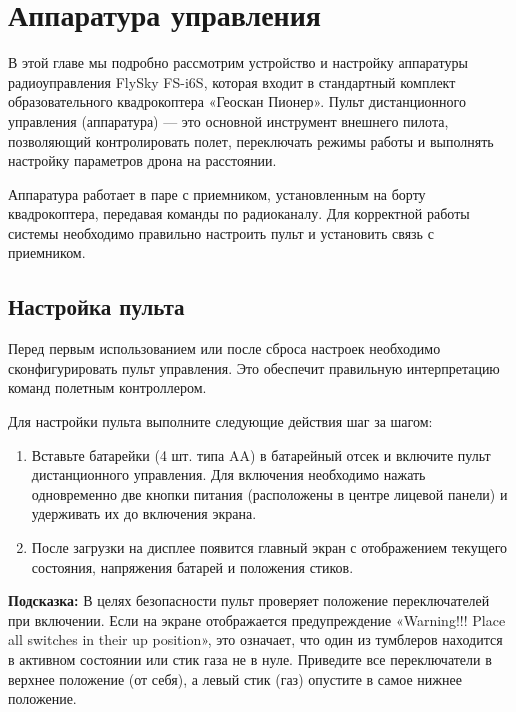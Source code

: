 \section{Аппаратура управления}
\label{sec:rc-control}

В этой главе мы подробно рассмотрим устройство и настройку аппаратуры радиоуправления FlySky FS-i6S, которая входит в стандартный комплект образовательного квадрокоптера «Геоскан Пионер». Пульт дистанционного управления (аппаратура) — это основной инструмент внешнего пилота, позволяющий контролировать полет, переключать режимы работы и выполнять настройку параметров дрона на расстоянии.

Аппаратура работает в паре с приемником, установленным на борту квадрокоптера, передавая команды по радиоканалу. Для корректной работы системы необходимо правильно настроить пульт и установить связь с приемником.

\subsection{Настройка пульта}

Перед первым использованием или после сброса настроек необходимо сконфигурировать пульт управления. Это обеспечит правильную интерпретацию команд полетным контроллером.

Для настройки пульта выполните следующие действия шаг за шагом:

\begin{enumerate}
    \item Вставьте батарейки (4 шт. типа AA) в батарейный отсек и включите пульт дистанционного управления. Для включения необходимо нажать одновременно две кнопки питания (расположены в центре лицевой панели) и удерживать их до включения экрана.
    \item После загрузки на дисплее появится главный экран с отображением текущего состояния, напряжения батарей и положения стиков.
\end{enumerate}

\begin{hintbox}
    \textbf{Подсказка:} В целях безопасности пульт проверяет положение переключателей при включении. Если на экране отображается предупреждение «Warning!!! Place all switches in their up position», это означает, что один из тумблеров находится в активном состоянии или стик газа не в нуле. Приведите все переключатели в верхнее положение (от себя), а левый стик (газ) опустите в самое нижнее положение.
\end{hintbox}

